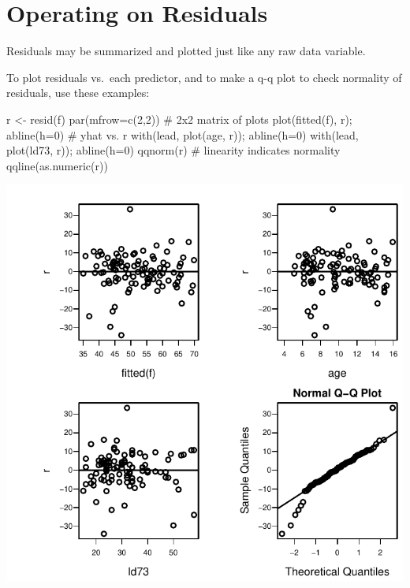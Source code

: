 \section{Operating on Residuals}
Residuals may be summarized and plotted just like any raw data
variable.
\bi
\item To plot residuals vs.\ each predictor, and to make a q-q plot to check normality of residuals, use these examples:
\begin{Schunk}
\begin{Sinput}
r <- resid(f)
par(mfrow=c(2,2))   # 2x2 matrix of plots
plot(fitted(f), r); abline(h=0)  # yhat vs. r
with(lead, plot(age,  r));    abline(h=0)
with(lead, plot(ld73, r));    abline(h=0)
qqnorm(r)           # linearity indicates normality
qqline(as.numeric(r))
\end{Sinput}


\centerline{\includegraphics{rmsintro-unnamed-chunk-7-1} }

\end{Schunk}
\ei


